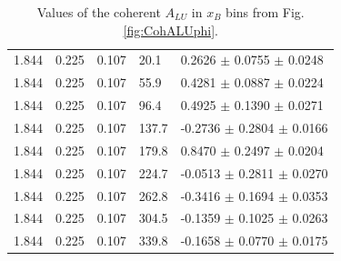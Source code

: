\documentclass[aps,prc,preprint,superscriptaddress]{revtex4}
\begin{document}
\begin{table}[!h]
\begin{center}
\begin{tabular}{||l|l|l|l|l||}
  1.844 & 0.225 & 0.107 & 20.1  &  0.2626 $\pm$ 0.0755 $\pm$ 0.0248 \\
  1.844 & 0.225 & 0.107 & 55.9  &  0.4281 $\pm$ 0.0887 $\pm$ 0.0224 \\
  1.844 & 0.225 & 0.107 & 96.4  &  0.4925 $\pm$ 0.1390 $\pm$ 0.0271 \\
  1.844 & 0.225 & 0.107 & 137.7 & -0.2736 $\pm$ 0.2804 $\pm$ 0.0166 \\
  1.844 & 0.225 & 0.107 & 179.8 &  0.8470 $\pm$ 0.2497 $\pm$ 0.0204 \\
  1.844 & 0.225 & 0.107 & 224.7 & -0.0513 $\pm$ 0.2811 $\pm$ 0.0270 \\
  1.844 & 0.225 & 0.107 & 262.8 & -0.3416 $\pm$ 0.1694 $\pm$ 0.0353 \\
  1.844 & 0.225 & 0.107 & 304.5 & -0.1359 $\pm$ 0.1025 $\pm$ 0.0263 \\
  1.844 & 0.225 & 0.107 & 339.8 & -0.1658 $\pm$ 0.0770 $\pm$ 0.0175 \\
         
         \hline 
         \hline
      \end{tabular}
      \caption{Values of the coherent $A_{LU}$ in $x_B$ bins from Fig. \ref{fig:CohALUphi}.}
      \label{table:Coh_xB_BSA}
   \end{center}
\end{table}                        
\end{document}
